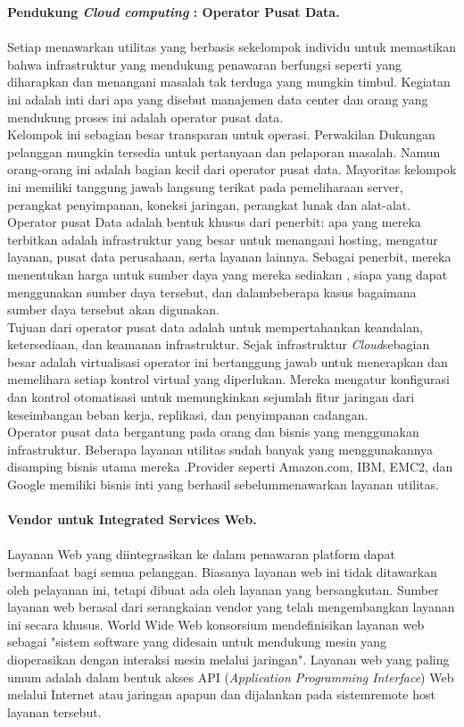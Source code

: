 \textbf{Pendukung \textit{Cloud computing} : Operator Pusat Data.}\\\\
Setiap menawarkan utilitas yang berbasis sekelompok individu untuk memastikan bahwa infrastruktur yang mendukung penawaran berfungsi seperti yang diharapkan dan menangani masalah tak terduga yang mungkin timbul. Kegiatan ini adalah inti dari apa yang disebut manajemen data center dan orang yang mendukung proses ini adalah operator pusat data.\\
Kelompok ini sebagian besar transparan untuk operasi. Perwakilan Dukungan pelanggan mungkin tersedia untuk pertanyaan dan pelaporan masalah. Namun orang-orang ini adalah bagian kecil dari operator pusat data. Mayoritas kelompok ini memiliki tanggung jawab langsung terikat pada pemeliharaan server, perangkat penyimpanan, koneksi  jaringan,  perangkat  lunak dan alat-alat.\\
\tab Operator pusat Data adalah bentuk khusus dari penerbit: apa yang mereka terbitkan adalah infrastruktur yang besar untuk menangani hosting, mengatur layanan, pusat data perusahaan, serta layanan lainnya. Sebagai penerbit, mereka menentukan harga untuk sumber daya yang mereka sediakan , siapa yang dapat menggunakan sumber daya tersebut, dan dalambeberapa kasus bagaimana sumber  daya tersebut akan digunakan.\\
Tujuan dari operator pusat data adalah untuk mempertahankan keandalan, ketersediaan, dan keamanan infrastruktur. Sejak infrastruktur \textit{Cloud}sebagian besar adalah virtualisasi operator ini bertanggung jawab untuk menerapkan dan memelihara setiap kontrol virtual yang diperlukan. Mereka mengatur konfigurasi dan kontrol otomatisasi untuk memungkinkan sejumlah  fitur jaringan dari keseimbangan beban kerja, replikasi, dan penyimpanan  cadangan.\\
\tab Operator pusat data bergantung pada orang dan bisnis yang menggunakan infrastruktur. Beberapa layanan utilitas sudah banyak yang menggunakannya disamping  bisnis  utama mereka .Provider seperti Amazon.com, IBM, EMC2, dan Google memiliki bisnis inti  yang  berhasil  sebelummenawarkan layanan utilitas.\\\\
\textbf{Vendor untuk Integrated Services Web.}\\\\
Layanan Web yang diintegrasikan ke dalam penawaran platform dapat bermanfaat bagi semua pelanggan. Biasanya layanan web ini tidak ditawarkan oleh pelayanan ini, tetapi dibuat ada  oleh layanan yang  bersangkutan.  Sumber  layanan  web  berasal dari  serangkaian  vendor yang telah mengembangkan layanan ini secara khusus. World Wide Web konsorsium mendefinisikan layanan web sebagai "sistem software yang didesain untuk mendukung mesin yang dioperasikan dengan interaksi mesin melalui jaringan". Layanan web yang paling umum adalah dalam bentuk akses API (\textit{Application Programming Interface}) Web melalui Internet atau jaringan apapun dan dijalankan pada sistemremote host  layanan tersebut.\\
